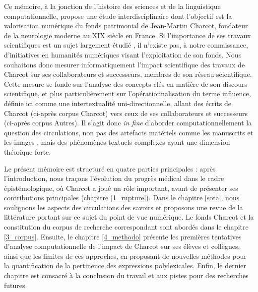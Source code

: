 \label{intro}
Ce mémoire, à la jonction de l'histoire des sciences et de la linguistique computationnelle, propose une étude interdisciplinaire dont l'objectif est la valorisation numérique du fonds patrimonial de Jean-Martin Charcot, fondateur de la neurologie moderne au XIX\ieme{} siècle en France. Si l'importance de ses travaux scientifiques est un sujet largement étudié \citep{bogousslavsky2011following,broussolle2012,camargo2024}, il n'existe pas, à notre connaissance, d'initiatives en humanités numériques visant l'exploitation de son fonds. Nous souhaitons donc mesurer informatiquement l'impact scientifique des travaux de Charcot sur ses collaborateurs et successeurs, membres de son réseau scientifique. Cette mesure se fonde sur l'analyse des concepts-clés en matière de son discours scientifique, et plus particulièrement sur l'opérationnalisation du terme \og{}influence\fg{}, définie ici comme une intertextualité uni-directionnelle, allant des écrits de Charcot (ci-après corpus \og{}Charcot\fg{}) vers ceux de ses collaborateurs et successeurs (ci-après corpus \og{}Autres\fg{}). Il s'agit donc \textit{in fine} d'aborder computationnellement la question des circulations, non pas des artefacts matériels comme les manuscrits \citep{gabay2021katabase} et les images \citep{joyeux2019visual}, mais des phénomènes textuels complexes \citep{manjavacas} ayant une dimension théorique forte.

Le présent mémoire est structuré en quatre parties principales : après l'introduction, nous traçons l'évolution du progrès médical dans le cadre épistémologique, où Charcot a joué un rôle important, avant de présenter ses contributions principales (chapitre \ref{1_rupture}). Dans le chapitre \ref{sota}, nous soulignons les aspects des circulations des savoirs et proposons une revue de la littérature portant sur ce sujet du point de vue numérique. Le fonds Charcot et la constitution du corpus de recherche correspondant sont abordés dans le chapitre \ref{3_corpus}. Ensuite, le chapitre \ref{4_methodo} présente les premières tentatives d'analyse computationnelle de l'impact de Charcot sur ses élèves et collègues, ainsi que les limites de ces approches, en proposant de nouvelles méthodes pour la quantification de la pertinence des expressions polylexicales. Enfin, le dernier chapitre est consacré à la conclusion du travail et aux pistes pour des recherches futures.










